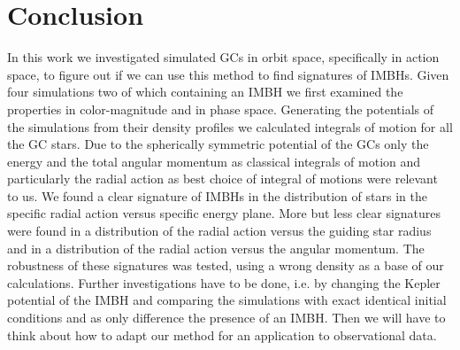 \section{Conclusion}
In this work we investigated simulated \acp{GC} in orbit space, specifically in action space, to figure out if we can use this method to find signatures of \acp{IMBH}. Given four simulations two of which containing an \ac{IMBH} we first examined the properties in color-magnitude and in phase space. Generating the potentials of the simulations from their density profiles we calculated integrals of motion for all the \ac{GC} stars. Due to the spherically symmetric potential of the \acp{GC} only the energy and the total angular momentum as classical integrals of motion and particularly the radial action as best choice of integral of motions were relevant to us. We found a clear signature of \acp{IMBH} in the distribution of stars in the specific radial action versus specific energy plane. More but less clear signatures were found in a distribution of the radial action versus the guiding star radius and in a distribution of the radial action versus the angular momentum. The robustness of these signatures was tested, using a wrong density as a base of our calculations. Further investigations have to be done, i.e. by changing the Kepler potential of the \ac{IMBH} and comparing the simulations with exact identical initial conditions and as only difference the presence of an \ac{IMBH}. Then we will have to think about how to adapt our method for an application to observational data. 